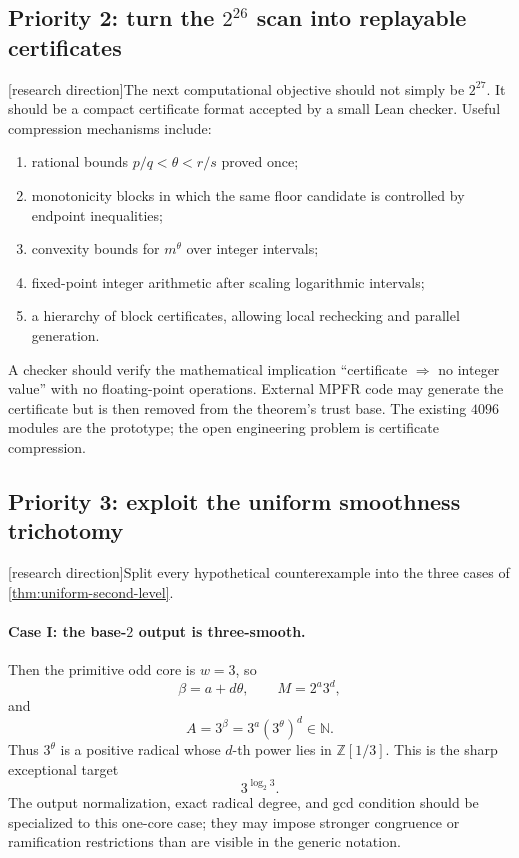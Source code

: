 \documentclass[11pt,oneside]{article}
\theoremstyle{definition}
\newcommand{\N}{\mathbb N}
\newcommand{\Z}{\mathbb Z}
\newcommand{\tagProposal}{\textcolor{BrickRed}{\textsf{[research direction]}}}
\begin{document}
\subsection{Priority 2: turn the \texorpdfstring{\(2^{26}\)}{2-to-the-26} scan into replayable certificates}

\tagProposal The next computational objective should not simply be \(2^{27}\).  It should
be a compact certificate format accepted by a small Lean checker.  Useful compression
mechanisms include:
\begin{enumerate}
\item rational bounds \(p/q<\theta<r/s\) proved once;
\item monotonicity blocks in which the same floor candidate is controlled by endpoint
inequalities;
\item convexity bounds for \(m^\theta\) over integer intervals;
\item fixed-point integer arithmetic after scaling logarithmic intervals;
\item a hierarchy of block certificates, allowing local rechecking and parallel generation.
\end{enumerate}

A checker should verify the mathematical implication ``certificate \(\Rightarrow\) no
integer value'' with no floating-point operations.  External MPFR code may generate the
certificate but is then removed from the theorem's trust base.  The existing \(4096\)
modules are the prototype; the open engineering problem is certificate compression.

\subsection{Priority 3: exploit the uniform smoothness trichotomy}

\tagProposal Split every hypothetical counterexample into the three cases of
\cref{thm:uniform-second-level}.

\paragraph{Case I: the base-$2$ output is three-smooth.}
Then the primitive odd core is \(w=3\), so
\[
  \beta=a+d\theta,
  \qquad
  M=2^a3^d,
\]
and
\[
  A=3^\beta=3^a(3^\theta)^d\in\N.
\]
Thus \(3^\theta\) is a positive radical whose \(d\)-th power lies in \(\Z[1/3]\).
This is the sharp exceptional target
\[
  3^{\log_2 3}.
\]
The output normalization, exact radical degree, and gcd condition should be specialized to
this one-core case; they may impose stronger congruence or ramification restrictions than
are visible in the generic notation.
\end{document}
